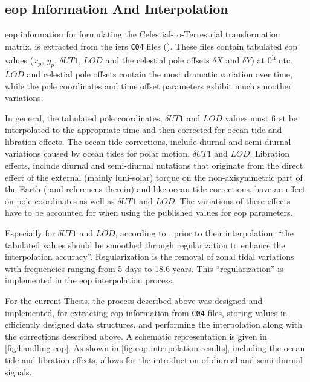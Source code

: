 \subsection{\gls{eop} Information And Interpolation}\label{ssec:eop-interpolation}

\Gls{eop} information for formulating the Celestial-to-Terrestrial transformation 
matrix, is extracted from the \gls{iers} \texttt{C04} files (\cite{Bizouard2019}).
These files contain tabulated \gls{eop} values ($x_p$, $y_p$, $\delta UT1$, $LOD$ and 
the celestial pole offsets $\delta X$ and $\delta Y$) at 0\textsuperscript{h} \gls{utc}. 
$LOD$ and celestial pole offsets contain the most dramatic variation over time, while 
the pole coordinates and time offset parameters exhibit much smoother variations.

In general, the tabulated pole coordinates, $\delta UT1$ and $LOD$ values must first 
be interpolated to the appropriate time and then corrected for ocean tide and 
libration effects. The ocean tide corrections, include diurnal and semi-diurnal 
variations caused by ocean tides for polar motion, $\delta UT1$ and $LOD$. Libration effects, 
include diurnal and semi-diurnal nutations that originate from the direct effect 
of the external (mainly luni-solar) torque on the non-axisymmetric part of the Earth 
(\cite{iers2010} and references therein) and like ocean tide corrections, have an effect on 
pole coordinates as well as $\delta UT1$ and $LOD$. The variations of these effects 
have to be accounted for when using the published values for \gls{eop} parameters.

Especially for $\delta UT1$ and $LOD$, according to \cite{Bradley2016}, 
prior to their interpolation, ``the tabulated values should be smoothed through regularization 
to enhance the interpolation accuracy''. Regularization is the removal of zonal tidal 
variations with frequencies ranging from 5 days to 18.6 years. This ``regularization'' is 
implemented in the \gls{eop} interpolation process.

For the current Thesis, the process described above was designed and implemented, for 
extracting \gls{eop} information from \texttt{C04} files, storing values in efficiently designed 
data structures, and performing the interpolation along with the corrections described above.
A schematic representation is given in \autoref{fig:handling-eop}. As shown in 
\autoref{fig:eop-interpolation-results}, including the ocean tide and libration 
effects, allows for the introduction of diurnal and semi-diurnal signals.

